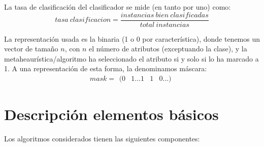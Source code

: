 \documentclass[a4paper,11pt]{article}
\begin{document}
La tasa de clasificación del clasificador se mide (en tanto por uno) como: $$tasa\: clasificacion = \frac{instancias\: 
bien\: clasificadas}{total\: instancias}$$

La representación usada es la binaria (1 o 0 por característica), donde tenemos un vector de tamaño $n$, con $n$ el número 
de atributos (exceptuando la clase), y la metaheaurística/algoritmo ha seleccionado el atributo si y solo si lo ha marcado 
a 1. A una representación de esta forma, la denominamos máscara: $$ mask =\begin{matrix} (0 & 1\ldots 1 & 1 & 0\ldots) 
\end{matrix}$$

\newpage
\section{Descripción elementos básicos}
Los algoritmos considerados tienen las siguientes componentes:
\end{document}
